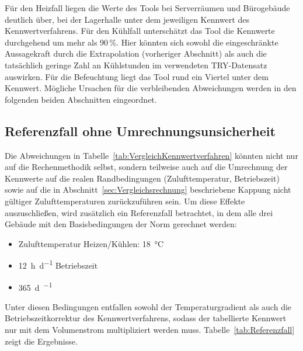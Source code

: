 \documentclass{scrreprt}
\begin{document}
Für den Heizfall liegen die Werte des Tools bei Serverräumen und
Bürogebäude deutlich über, bei der Lagerhalle unter dem jeweiligen
Kennwert des Kennwertverfahrens. Für den Kühlfall unterschätzt das
Tool die Kennwerte durchgehend um mehr als \num{90}\,\%. Hier könnten sich
sowohl die eingeschränkte Aussagekraft durch die Extrapolation
(vorheriger Abschnitt) als auch die tatsächlich geringe Zahl an
Kühlstunden im verwendeten \ac{TRY}-Datensatz auswirken. Für die
Befeuchtung liegt das Tool rund ein Viertel unter dem Kennwert.
Mögliche Ursachen für die verbleibenden Abweichungen werden in den
folgenden beiden Abschnitten eingeordnet.

\subsection{Referenzfall ohne Umrechnungsunsicherheit}\label{sec:Referenzfall}
Die Abweichungen in Tabelle~\ref{tab:VergleichKennwertverfahren} könnten 
nicht nur auf die Rechenmethodik selbst, sondern
teilweise auch auf die Umrechnung der Kennwerte auf die realen
Randbedingungen (Zulufttemperatur, Betriebszeit) sowie auf die in
Abschnitt~\ref{sec:Vergleichsrechnung} beschriebene Kappung nicht
gültiger Zulufttemperaturen zurückzuführen sein. Um diese Effekte auszuschließen, wird
zusätzlich ein Referenzfall betrachtet, in dem alle drei Gebäude mit
den Basisbedingungen der Norm gerechnet werden:

\begin{itemize}
    \item Zulufttemperatur Heizen/Kühlen: \SI{18}{\celsius}
    \item \SI{12}{\hour\per\day} Betriebszeit
    \item \SI{365}{\day\per\year}
\end{itemize}

Unter diesen Bedingungen entfallen sowohl der Temperaturgradient als auch die Betriebszeitkorrektur des Kennwertverfahrens, sodass der
tabellierte Kennwert nur mit dem Volumenstrom multipliziert werden muss. Tabelle~\ref{tab:Referenzfall}
zeigt die Ergebnisse.
\end{document}
